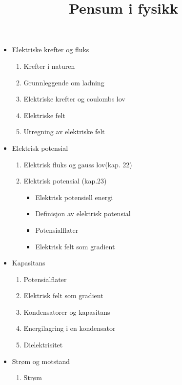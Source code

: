 \documentclass[11pt]{article}
\title{Pensum i fysikk}
\begin{document}
  \maketitle
    \begin{flushleft}
      \begin{itemize}
          \item Elektriske krefter og fluks
          \begin{enumerate}
            \item Krefter i naturen
            \item Grunnleggende om ladning
            \item Elektriske krefter og coulombs lov
            \item Elektriske felt
            \item Utregning av elektriske felt
          \end{enumerate}
          \item Elektrisk potensial
          \begin{enumerate}
            \item Elektrisk fluks og gauss lov(kap. 22)
            \item Elektrisk potensial (kap.23)
            \begin{itemize}
              \item Elektrisk potensiell energi
              \item Definisjon av elektrisk potensial
              \item Potensialflater
              \item Elektrisk felt som gradient
            \end{itemize}
          \end{enumerate}
          \item Kapasitans
          \begin{enumerate}
            \item Potensialflater
            \item Elektrisk felt som gradient
            \item Kondensatorer og kapasitans
            \item Energilagring i en kondensator
            \item Dielektrisitet
          \end{enumerate}
          \item Strøm og motstand
          \begin{enumerate}
            \item Strøm

\end{enumerate}
\end{itemize}
\end{flushleft}
\end{document}

